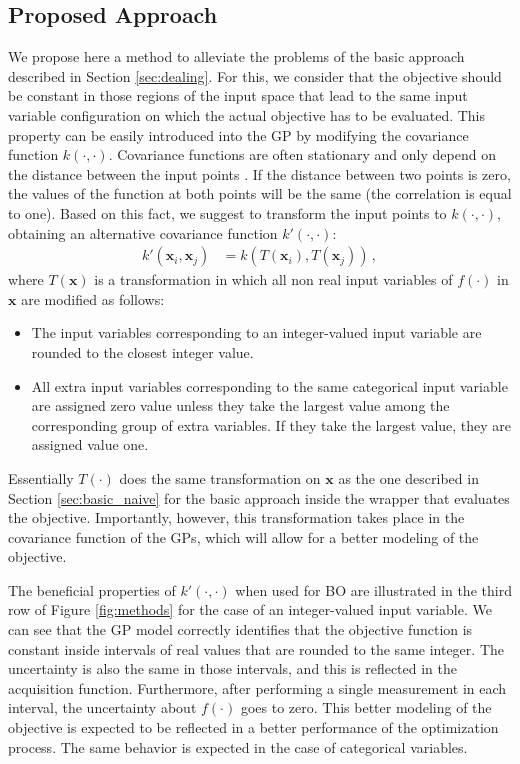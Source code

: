 \subsection{Proposed Approach} \label{sec:integer}

We propose here a method to alleviate the problems of the basic approach described in Section \ref{sec:dealing}. 
For this, we consider that the objective should be constant in those regions of the input space that
lead to the same input variable configuration on which the actual objective has to be evaluated. 
This property can be easily introduced into the GP by modifying the covariance function
$k(\cdot,\cdot)$. Covariance functions are often stationary and only depend on the distance between the 
input points \citep{rasmussen2003gaussian}. If the distance between two points is zero, the values of the function at 
both points will be the same (the correlation is equal to one). Based on this fact, we suggest to transform 
the input points to $k(\cdot,\cdot)$, obtaining an alternative covariance function $k'(\cdot,\cdot)$:
\begin{align}
k'(\mathbf{x}_i,\mathbf{x}_j) &= k(T(\mathbf{x}_i),T(\mathbf{x}_j)) \,,
\label{eq:covariance}
\end{align}
where $T(\mathbf{x})$ is a transformation in which all non real input variables of $f(\cdot)$ in $\mathbf{x}$ 
are modified as follows:
\begin{itemize}
\item The input variables corresponding to an integer-valued input variable are rounded to the closest integer value.
\item All extra input variables corresponding to the same categorical input variable are assigned zero value unless
	they take the largest value among the corresponding group of extra variables. If they take the largest value,
	they are assigned value one.
\end{itemize}
Essentially $T(\cdot)$ does the same transformation on $\mathbf{x}$ as the one described in Section
\ref{sec:basic_naive} for the basic approach inside the wrapper that evaluates the objective. Importantly, however, 
this transformation takes place in the covariance function of the GPs, which will allow for a 
better modeling of the objective. 

The beneficial properties of $k'(\cdot,\cdot)$ when used for BO are illustrated in the 
third row of Figure \ref{fig:methods} for the case of an integer-valued input variable. 
We can see that the GP model correctly identifies that the objective function is constant 
inside intervals of real values that are rounded to the same integer. The uncertainty is also 
the same in those intervals, and this is reflected in the acquisition function. Furthermore, after performing 
a single measurement in each interval, the uncertainty about $f(\cdot)$ goes to zero. This better modeling
of the objective is expected to be reflected in a better performance of the optimization process.
The same behavior is expected in the case of categorical variables.

